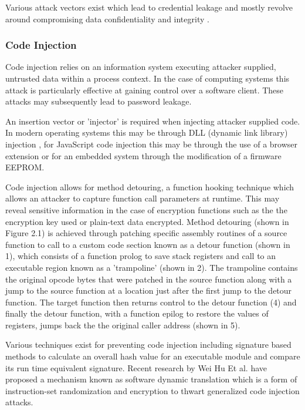 Various attack vectors exist which lead to credential leakage and mostly revolve around compromising data confidentiality and integrity \cite{embedded_security}.


\subsubsection{Code Injection}
Code injection relies on an information system executing attacker supplied, untrusted data within a process context. In the case of computing systems this attack is particularly effective at gaining control over a software client. These attacks may subsequently lead to password leakage.

An insertion vector or 'injector' is required when injecting attacker supplied code. In modern operating systems this may be through DLL (dynamic link library) injection \cite{game_hacking}, for JavaScript code injection this may be through the use of a browser extension or for an embedded system through the modification of a firmware EEPROM. 

Code injection allows for method detouring, a function hooking technique which allows an attacker to capture function call parameters at runtime. This may reveal sensitive information in the case of encryption functions such as the the encryption key used or plain-text data encrypted. Method detouring (shown in Figure 2.1) is achieved through patching specific assembly routines of a source function to call to a custom code section known as a detour function (shown in 1), which consists of a function prolog to save stack registers and call to an executable region known as a 'trampoline' (shown in 2). The trampoline contains the original opcode bytes that were patched in the source function along with a jump to the source function at a location just after the first jump to the detour function. The target function then returns control to the detour function (4) and finally the detour function, with a function epilog to restore the values of registers, jumps back the the original caller address (shown in 5)\cite{code_injection}.

Various techniques exist for preventing code injection including signature based methods to calculate an overall hash value for an executable module and compare its run time equivalent signature. Recent research by Wei Hu Et al. \cite{code_injection2} have proposed a mechanism known as software dynamic translation which is a form of instruction-set randomization and encryption to thwart generalized code injection attacks.

